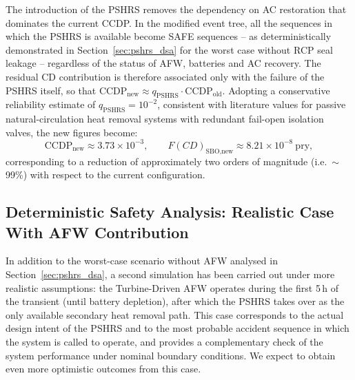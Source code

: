 \documentclass[a4paper,11pt]{article}
\numberwithin{subsubsection}{subsection}
\numberwithin{subsection}{section}
\begin{document}
The introduction of the PSHRS removes the dependency on AC
restoration that dominates the current CCDP. In the modified event
tree, all the sequences in which the PSHRS is available become SAFE
sequences -- as deterministically demonstrated in
Section~\ref{sec:pshrs_dsa} for the worst case without RCP seal
leakage -- regardless of the status of AFW, batteries and AC
recovery. The residual CD contribution is therefore associated only
with the failure of the PSHRS itself, so that
$\text{CCDP}_{\text{new}} \approx q_{\text{PSHRS}} \cdot
\text{CCDP}_{\text{old}}$. Adopting a conservative reliability
estimate of $q_{\text{PSHRS}} = 10^{-2}$, consistent with literature
values for passive natural-circulation heat removal systems with
redundant fail-open isolation valves, the new figures become:
\begin{equation}
\text{CCDP}_{\text{new}} \approx 3.73 \times10^{-3},
\qquad
F(CD)_{\text{SBO,new}} \approx 8.21\times 10^{-8}\ \text{pry},
\end{equation}
corresponding to a reduction of approximately two orders of
magnitude (i.e.\ $\sim$99\%) with respect to the current
configuration. 

\subsection{Deterministic Safety Analysis: Realistic Case With AFW Contribution}
\label{sec:pshrs_dsa_withafw}

In addition to the worst-case scenario without AFW analysed in
Section~\ref{sec:pshrs_dsa}, a second simulation has been carried
out under more realistic assumptions: the Turbine-Driven AFW
operates during the first 5\,h of the transient (until battery
depletion), after which the PSHRS takes over as the only available
secondary heat removal path. This case corresponds to the actual
design intent of the PSHRS and to the most probable accident
sequence in which the system is called to operate, and provides a
complementary check of the system performance under nominal
boundary conditions. We expect to obtain even more optimistic outcomes from this case.
\end{document}
